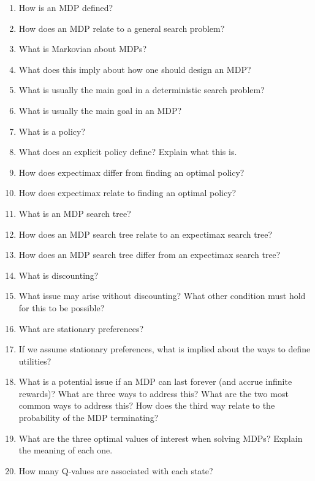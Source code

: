\documentclass[]{article}
\begin{document}
\begin{enumerate}
\item How is an MDP defined?
\item How does an MDP relate to a general search problem? \\
\item What is Markovian about MDPs?
\item What does this imply about how one should design an MDP? \\
\item What is usually the main goal in a deterministic search problem?
\item What is usually the main goal in an MDP? \\
\item What is a policy?
\item What does an explicit policy define? Explain what this is.
\item How does expectimax differ from finding an optimal policy?
\item How does expectimax relate to finding an optimal policy? \\
\item What is an MDP search tree?
\item How does an MDP search tree relate to an expectimax search tree?
\item How does an MDP search tree differ from an expectimax search tree? \\
\item What is discounting?
\item What issue may arise without discounting? What other condition must hold for this to be possible? \\
\item What are stationary preferences?
\item If we assume stationary preferences, what is implied about the ways to define utilities? \\
\item What is a potential issue if an MDP can last forever (and accrue infinite rewards)? What are three ways to address this? What are the two most common ways to address this? How does the third way relate to the probability of the MDP terminating? \\
\item What are the three optimal values of interest when solving MDPs? Explain the meaning of each one. \\
\item How many Q-values are associated with each state?

\end{enumerate}
\end{document}
